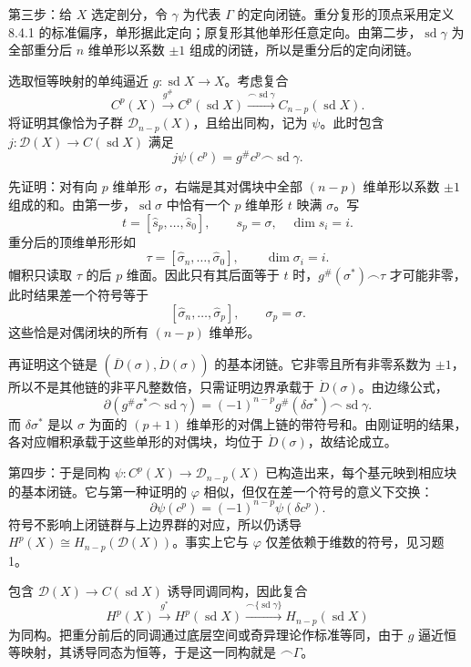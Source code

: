 第三步：给 $X$ 选定剖分，令 $\gamma$ 为代表 $\Gamma$ 的定向闭链。重分复形的顶点采用定义 8.4.1 的标准偏序，单形据此定向；原复形其他单形任意定向。由第二步，$\operatorname{sd}\gamma$ 为全部重分后 $n$ 维单形以系数 $\pm1$ 组成的闭链，所以是重分后的定向闭链。

选取恒等映射的单纯逼近 $g:\operatorname{sd}X\to X$。考虑复合
\[
C^p(X)\xrightarrow{g^\#}C^p(\operatorname{sd}X)
\xrightarrow{\frown\operatorname{sd}\gamma}C_{n-p}(\operatorname{sd}X).
\]
将证明其像恰为子群 $\mathcal D_{n-p}(X)$，且给出同构，记为 $\psi$。此时包含 $j:\mathcal D(X)\to C(\operatorname{sd}X)$ 满足
\[j\psi(c^p)=g^\#c^p\frown\operatorname{sd}\gamma.\]

先证明：对有向 $p$ 维单形 $\sigma$，右端是其对偶块中全部 $(n-p)$ 维单形以系数 $\pm1$ 组成的和。由第一步，$\operatorname{sd}\sigma$ 中恰有一个 $p$ 维单形 $t$ 映满 $\sigma$。写
\[t=[\widehat s_p,\ldots,\widehat s_0],\qquad s_p=\sigma,\quad\dim s_i=i.\]
重分后的顶维单形形如
\[\tau=[\widehat\sigma_n,\ldots,\widehat\sigma_0],\qquad\dim\sigma_i=i.\]
帽积只读取 $\tau$ 的后 $p$ 维面。因此只有其后面等于 $t$ 时，$g^\#(\sigma^*)\frown\tau$ 才可能非零，此时结果差一个符号等于
\[[\widehat\sigma_n,\ldots,\widehat\sigma_p],\qquad\sigma_p=\sigma.\]
这些恰是对偶闭块的所有 $(n-p)$ 维单形。

再证明这个链是 $(\overline D(\sigma),\dot D(\sigma))$ 的基本闭链。它非零且所有非零系数为 $\pm1$，所以不是其他链的非平凡整数倍，只需证明边界承载于 $\dot D(\sigma)$。由边缘公式，
\[
\partial(g^\#\sigma^*\frown\operatorname{sd}\gamma)
=(-1)^{n-p}g^\#(\delta\sigma^*)\frown\operatorname{sd}\gamma.
\tag{*}
\]
而 $\delta\sigma^*$ 是以 $\sigma$ 为面的 $(p+1)$ 维单形的对偶上链的带符号和。由刚证明的结果，各对应帽积承载于这些单形的对偶块，均位于 $\dot D(\sigma)$，故结论成立。

第四步：于是同构 $\psi:C^p(X)\to\mathcal D_{n-p}(X)$ 已构造出来，每个基元映到相应块的基本闭链。它与第一种证明的 $\varphi$ 相似，但仅在差一个符号的意义下交换：
\[\partial\psi(c^p)=(-1)^{n-p}\psi(\delta c^p).\]
符号不影响上闭链群与上边界群的对应，所以仍诱导 $H^p(X)\cong H_{n-p}(\mathcal D(X))$。事实上它与 $\varphi$ 仅差依赖于维数的符号，见习题 1。

包含 $\mathcal D(X)\to C(\operatorname{sd}X)$ 诱导同调同构，因此复合
\[H^p(X)\xrightarrow{g^*}H^p(\operatorname{sd}X)
\xrightarrow{\frown\{\operatorname{sd}\gamma\}}H_{n-p}(\operatorname{sd}X)\]
为同构。把重分前后的同调通过底层空间或奇异理论作标准等同，由于 $g$ 逼近恒等映射，其诱导同态为恒等，于是这一同构就是 $\frown\Gamma$。


